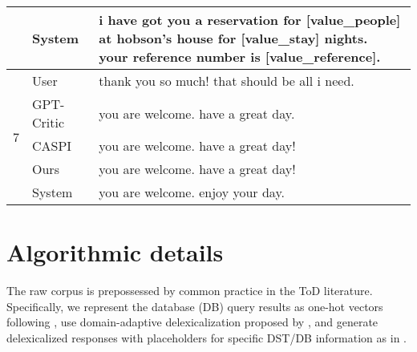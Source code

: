 \begin{table}[H]
{\begin{tabular}{@{}cll@{}}
                   & System     & \makecell[l]{i have got you a reservation for {[}value\_people{]} at hobson's house for {[}value\_stay{]} nights. \\ your reference number is {[}value\_reference{]}.}                                                                             \\ \midrule
\multirow{5}{*}{7} & User       & thank you so much! that should be all i need.                                                                                                                                                                                 \\ \cmidrule(l){2-3} 
                   & GPT-Critic & you are welcome. have a great day.                                                                                                                                                                                                \\ \cmidrule(l){2-3} 
                   & CASPI      & you are welcome. have a great day!                                                                                                                                                                                              \\ \cmidrule(l){2-3} 
                   & Ours       & you are welcome. have a great day!                                                                                                                                                                                              \\ \cmidrule(l){2-3} 
                   & System     & you are welcome. enjoy your day.                                                                                                                                                                                                  \\ \bottomrule
\end{tabular}
}
\end{table}


\clearpage
\section{Algorithmic details}\label{sec:algo_box}

The raw corpus is prepossessed by common practice in the ToD literature.
Specifically, we represent the database (DB) query results as one-hot vectors following \citet{multiwoz2018}, use domain-adaptive delexicalization proposed by \citet{wen2016network}, and generate delexicalized responses with placeholders for specific DST/DB information as in
\citet{damd2020}.


